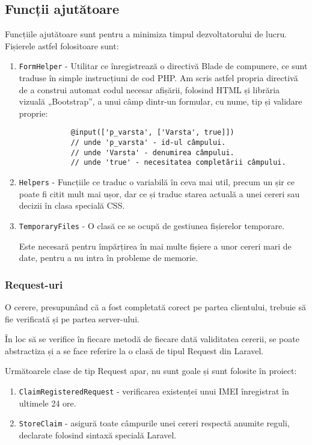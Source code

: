 \subsection{Funcții ajutătoare}

	Funcțiile ajutătoare sunt pentru a minimiza timpul dezvoltatorului de lucru.
	Fișierele astfel folositoare sunt:

	\begin{enumerate}
		\item \verb|FormHelper| - Utilitar ce înregistrează o directivă Blade de compunere, ce sunt traduse în simple instrucțiuni de cod PHP.
		Am scris astfel propria directivă de a construi automat codul necesar afișării, folosind HTML și librăria vizuală „Bootstrap”, a unui câmp dintr-un formular, cu nume, tip și validare proprie:
		\begin{verbatim}
			@input(['p_varsta', ['Varsta', true]])
			// unde 'p_varsta' - id-ul câmpului.
			// unde 'Varsta' - denumirea câmpului.
			// unde 'true' - necesitatea completării câmpului.
		\end{verbatim}
		\item \verb|Helpers| -
		Funcțiile ce traduc o variabilă în ceva mai util, precum un șir ce poate fi citit mult mai ușor, dar ce și traduc starea actuală a unei cereri sau decizii în clasa specială CSS.
		\item \verb|TemporaryFiles| - O clasă ce se ocupă de gestiunea fișierelor temporare.

		Este necesară pentru împărțirea în mai multe fișiere a unor cereri mari de date, pentru a nu intra în probleme de memorie.
	\end{enumerate}

	\subsubsection{Request-uri}

	O cerere, presupunând că a fost completată corect pe partea clientului, trebuie să fie verificată și pe partea server-ului.

	În loc să se verifice în fiecare metodă de fiecare dată validitatea cererii, se poate abstractiza și a se face referire la o clasă de tipul Request din Laravel.

	Următoarele clase de tip Request apar, nu sunt goale și sunt folosite în proiect:
	\begin{enumerate}
		\item \verb|ClaimRegisteredRequest| - verificarea existenței unui IMEI înregistrat în ultimele 24 ore.
		\item \verb|StoreClaim| - asigură toate câmpurile unei cereri respectă anumite reguli, declarate folosind sintaxă specială Laravel.
	\end{enumerate}

